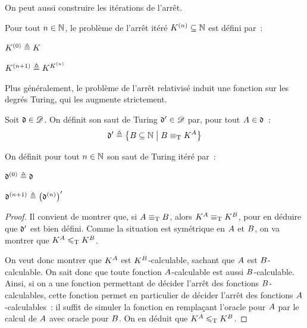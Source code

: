 On peut aussi construire les itérations de l'arrêt.

\begin{definition}
  Pour tout $n \in \mathbb N$, le problème de l'arrêt itéré $K^{(n)} \subseteq \mathbb N$
  est défini par~:
  \begin{itemize}
    \begin{minipage}{0.45\textwidth}
    \item $K^{(0)} \triangleq K$
    \end{minipage}
    \begin{minipage}{0.45\textwidth}
    \item $K^{(n+1)} \triangleq K^{K^{(n)}}$
    \end{minipage}
  \end{itemize}
\end{definition}

Plus généralement, le problème de l'arrêt relativisé induit une fonction sur les
degrés Turing, qui les augmente strictement.

\begin{definition}
  Soit $\mathfrak{d} \in \mathscr{D}$. On définit son saut de Turing
  $\mathfrak{d}' \in \mathscr{D}$ par, pour tout $A \in \mathfrak{d}$~:
  \[\mathfrak{d}' \triangleq
  \left\{ B \subseteq \mathbb N \;\middle\vert\; B \equiv_{\mathrm{T}} K^{A} \right\}\]

  On définit pour tout $n \in \mathbb N$ son saut de Turing itéré par~:
  \vspace{0.1cm}
  \begin{itemize}
    \begin{minipage}{0.45\textwidth}
    \item $\mathfrak{d}^{(0)} \triangleq \mathfrak{d}$
    \end{minipage}
    \begin{minipage}{0.45\textwidth}
    \item $\mathfrak{d}^{(n+1)} \triangleq \left(\mathfrak{d}^{(n)}\right)'$
    \end{minipage}
  \end{itemize}
\end{definition}

\begin{proof}
  Il convient de montrer que, si $A\equiv_{\mathrm{T}} B$, alors
  $K^{A}\equiv_{\mathrm{T}}K^{B}$, pour en déduire que $\mathfrak{d}'$ est bien
  défini. Comme la situation est symétrique en $A$ et $B$, on va
  montrer que $K^{A} \leqslant_{\mathrm{T}} K^{B}$.

  On veut donc montrer que $K^{A}$ est $K^{B}$-calculable,
  sachant que $A$ est $B$-calculable. On sait donc que toute fonction
  $A$-calculable est aussi $B$-calculable. Ainsi, si on a une
  fonction permettant de décider l'arrêt des fonctions $B$-calculables,
  cette fonction permet en particulier de décider l'arrêt des fonctions
  $A$-calculables~: il suffit de simuler la fonction en remplaçant l'oracle
  pour $A$ par le calcul de $A$ avec oracle pour $B$. On en
  déduit que $K^{A} \leqslant_{\mathrm{T}} K^{B}$.
\end{proof}

